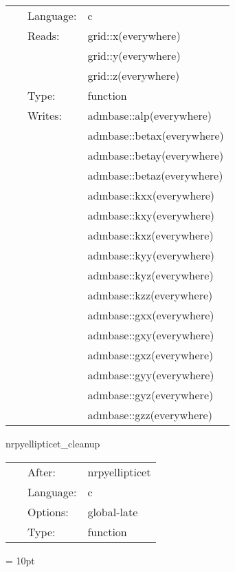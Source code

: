  \begin{tabular*}{160mm}{cll} 
~ & Language:  & c \\ 
~ & Reads:  & grid::x(everywhere) \\ 
~& ~ &grid::y(everywhere)\\ 
~& ~ &grid::z(everywhere)\\ 
~ & Type:  & function \\ 
~ & Writes:  & admbase::alp(everywhere) \\ 
~& ~ &admbase::betax(everywhere)\\ 
~& ~ &admbase::betay(everywhere)\\ 
~& ~ &admbase::betaz(everywhere)\\ 
~& ~ &admbase::kxx(everywhere)\\ 
~& ~ &admbase::kxy(everywhere)\\ 
~& ~ &admbase::kxz(everywhere)\\ 
~& ~ &admbase::kyy(everywhere)\\ 
~& ~ &admbase::kyz(everywhere)\\ 
~& ~ &admbase::kzz(everywhere)\\ 
~& ~ &admbase::gxx(everywhere)\\ 
~& ~ &admbase::gxy(everywhere)\\ 
~& ~ &admbase::gxz(everywhere)\\ 
~& ~ &admbase::gyy(everywhere)\\ 
~& ~ &admbase::gyz(everywhere)\\ 
~& ~ &admbase::gzz(everywhere)\\ 
\end{tabular*} 


\vspace{5mm}


\hspace{5mm} nrpyellipticet\_cleanup 

\hspace{5mm}{\it deallocate memory for arrays used when computing initial data } 


\hspace{5mm}

 \begin{tabular*}{160mm}{cll} 
~ & After:  & nrpyellipticet \\ 
~ & Language:  & c \\ 
~ & Options:  & global-late \\ 
~ & Type:  & function \\ 
\end{tabular*} 



\vspace{5mm}\parskip = 10pt 
